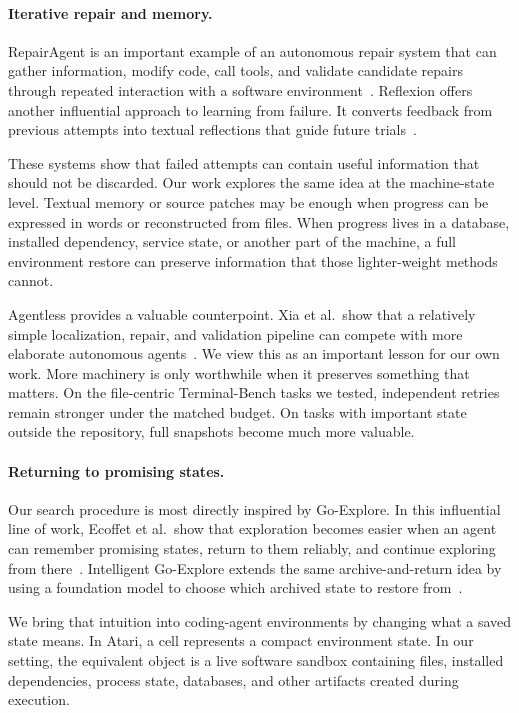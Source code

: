 \documentclass{article}
\begin{document}
\paragraph{Iterative repair and memory.}
RepairAgent is an important example of an autonomous repair system that can gather information, modify code, call tools, and validate candidate repairs through repeated interaction with a software environment~\citep{bouzenia2024repairagent}. Reflexion offers another influential approach to learning from failure. It converts feedback from previous attempts into textual reflections that guide future trials~\citep{shinn2023reflexion}.

These systems show that failed attempts can contain useful information that should not be discarded. Our work explores the same idea at the machine-state level. Textual memory or source patches may be enough when progress can be expressed in words or reconstructed from files. When progress lives in a database, installed dependency, service state, or another part of the machine, a full environment restore can preserve information that those lighter-weight methods cannot.

Agentless provides a valuable counterpoint. Xia et al.\ show that a relatively simple localization, repair, and validation pipeline can compete with more elaborate autonomous agents~\citep{xia2024agentless}. We view this as an important lesson for our own work. More machinery is only worthwhile when it preserves something that matters. On the file-centric Terminal-Bench tasks we tested, independent retries remain stronger under the matched budget. On tasks with important state outside the repository, full snapshots become much more valuable.

\paragraph{Returning to promising states.}
Our search procedure is most directly inspired by Go-Explore. In this influential line of work, Ecoffet et al.\ show that exploration becomes easier when an agent can remember promising states, return to them reliably, and continue exploring from there~\citep{ecoffet2021goexplore}. Intelligent Go-Explore extends the same archive-and-return idea by using a foundation model to choose which archived state to restore from~\citep{lu2025ige}.

We bring that intuition into coding-agent environments by changing what a saved state means. In Atari, a cell represents a compact environment state. In our setting, the equivalent object is a live software sandbox containing files, installed dependencies, process state, databases, and other artifacts created during execution.
\end{document}
